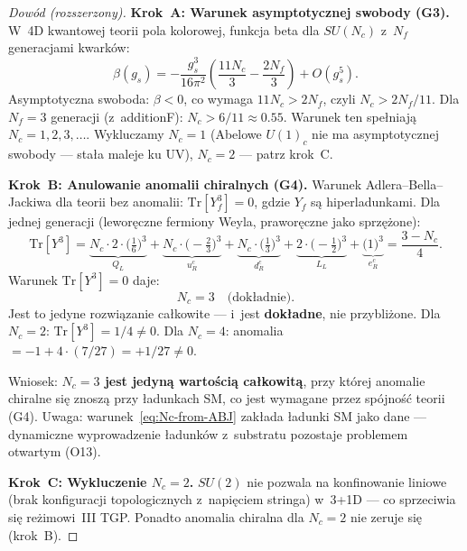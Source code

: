 \begin{proof}[Dowód (rozszerzony)]
\textbf{Krok~A: Warunek asymptotycznej swobody (G3).}
W~4D kwantowej teorii pola kolorowej, funkcja beta dla $SU(N_c)$
z~$N_f$ generacjami kwarków:
\begin{equation}\label{eq:beta-func}
    \beta(g_s) = -\frac{g_s^3}{16\pi^2}
    \left(\frac{11N_c}{3} - \frac{2N_f}{3}\right) + O(g_s^5).
\end{equation}
Asymptotyczna swoboda: $\beta < 0$, co wymaga
$11N_c > 2N_f$, czyli $N_c > 2N_f/11$.
Dla $N_f = 3$ generacji (z~additionF): $N_c > 6/11 \approx 0.55$.
Warunek ten spełniają $N_c = 1, 2, 3, \ldots$. Wykluczamy $N_c = 1$
(Abelowe $U(1)_c$ nie ma asymptotycznej swobody --- stała maleje ku
UV), $N_c = 2$ --- patrz krok~C.

\textbf{Krok~B: Anulowanie anomalii chiralnych (G4).}
Warunek Adlera--Bella--Jackiwa dla teorii bez anomalii:
$\mathrm{Tr}[Y_f^3] = 0$, gdzie $Y_f$ s\k{a} hiperladunkami.
Dla jednej generacji (lewor\k{e}czne fermiony Weyla,
prawor\k{e}czne jako sprz\k{e}\.zone):
\begin{equation}\label{eq:ABJ-cancel}
  \mathrm{Tr}[Y^3] =
  \underbrace{N_c \cdot 2 \cdot \bigl(\tfrac{1}{6}\bigr)^{\!3}}_{Q_L}
  + \underbrace{N_c \cdot \bigl(-\tfrac{2}{3}\bigr)^{\!3}}_{u_R^c}
  + \underbrace{N_c \cdot \bigl(\tfrac{1}{3}\bigr)^{\!3}}_{d_R^c}
  + \underbrace{2 \cdot \bigl(-\tfrac{1}{2}\bigr)^{\!3}}_{L_L}
  + \underbrace{\bigl(1\bigr)^3}_{e_R^c}
  = \frac{3 - N_c}{4}.
\end{equation}
Warunek $\mathrm{Tr}[Y^3] = 0$ daje:
\begin{equation}\label{eq:Nc-from-ABJ}
    \boxed{N_c = 3 \quad\text{(dok\l{}adnie).}}
\end{equation}
Jest to jedyne rozwi\k{a}zanie ca\l{}kowite --- i~jest \textbf{dok\l{}adne},
nie przybli\.zone.
Dla $N_c = 2$: $\mathrm{Tr}[Y^3] = 1/4 \neq 0$.
Dla $N_c = 4$: anomalia $= -1 + 4\cdot(7/27) = +1/27 \neq 0$.

Wniosek: \textbf{$N_c = 3$ jest jedyną wartością całkowitą}, przy której
anomalie chiralne się znoszą przy ładunkach SM, co jest wymagane
przez spójność teorii (G4). Uwaga: warunek~\eqref{eq:Nc-from-ABJ}
zakłada ładunki SM jako dane --- dynamiczne wyprowadzenie ładunków
z~substratu pozostaje problemem otwartym (O13).

\textbf{Krok~C: Wykluczenie $N_c = 2$.}
$SU(2)$ nie pozwala na konfinowanie liniowe (brak konfiguracji
topologicznych z~napięciem stringa) w~3+1D --- co sprzeciwia się
reżimowi~III TGP. Ponadto anomalia chiralna dla $N_c = 2$
nie zeruje się (krok~B).


\end{proof}
